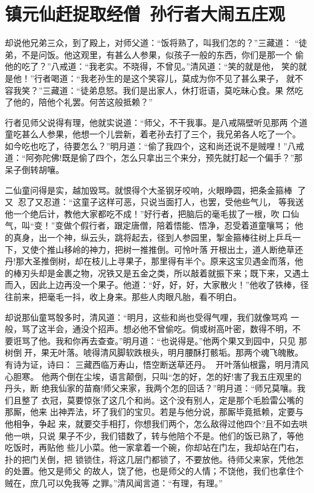 \chapter{镇元仙赶捉取经僧~孙行者大闹五庄观}

却说他兄弟三众，到了殿上，对师父道：“饭将熟了，叫我们怎的？”三藏道：
“徒弟，不是问饭。他这观里，有甚么人参果，似孩子一般的东西，你们是那一个
偷他的吃了？”八戒道：“我老实。不晓得，不曾见。”清风道：“笑的就是他，
笑的就是他！”行者喝道：“我老孙生的是这个笑容儿，莫成为你不见了甚么果子，
就不容我笑？”三藏道：“徒弟息怒。我们是出家人，休打诳语，莫吃昧心食。果
然吃了他的，陪他个礼罢。何苦这般抵赖？”

行者见师父说得有理，他就实说道：“师父，不干我事。是八戒隔壁听见那两
个道童吃甚么人参果，他想一个儿尝新，着老孙去打了三个，我兄弟各人吃了一个。
如今吃也吃了，待要怎么？”明月道：“偷了我四个，这和尚还说不是贼哩！”八戒
道：“阿弥陀佛!既是偷了四个，怎么只拿出三个来分，预先就打起一个偏手？”那
呆子倒转胡嚷。

二仙童问得是实，越加毁骂。就恨得个大圣钢牙咬响，火眼睁圆，把条金箍棒
了又，忍了又忍道：“这童子这样可恶，只说当面打人，也罢，受他些气儿，
等我送他一个绝后计，教他大家都吃不成！”好行者，把脑后的毫毛拔了一根，吹
口仙气，叫“变！”变做个假行者，跟定唐僧，陪着悟能、悟净，忍受着道童嚷骂；
他的真身，出一个神，纵云头，跳将起去，径到人参园里，掣金箍棒往树上乒乓一
下，又使个推山移岭的神力，把树一推推倒。可怜叶落开根出土，道人断绝草还
丹!那大圣推倒树，却在枝儿上寻果子，那里得有半个。原来这宝贝遇金而落，他
的棒刃头却是金裹之物，况铁又是五金之类，所以敲着就振下来；既下来，又遇土
而入，因此上边再没一个果子。他道：“好，好，好，大家散火！”他收了铁棒，径
往前来，把毫毛一抖，收上身来。那些人肉眼凡胎，看不明白。

却说那仙童骂彀多时，清风道：“明月，这些和尚也受得气哩，我们就像骂鸡
一般，骂了这半会，通没个招声。想必他不曾偷吃。倘或树高叶密，数得不明，不
要诳骂了他。我和你再去查查。”明月道：“也说得是。”他两个果又到园中，只见
那树倒开，果无叶落。唬得清风脚软跌根头，明月腰酥打骸垢。那两个魂飞魄散。
有诗为证，诗曰：
三藏西临万寿山，悟空断送草还丹。
开叶落仙根露，明月清风心胆寒。
他两个倒在尘埃，语言颠倒，只叫“怎的好，怎的好!害了我五庄观里的丹头，断
绝我仙家的苗裔!师父来家，我两个怎的回话？”明月道：“师兄莫嚷。我们且整了
衣冠，莫要惊张了这几个和尚。这个没有别人，定是那个毛脸雷公嘴的那厮，他来
出神弄法，坏了我们的宝贝。若是与他分说，那厮毕竟抵赖，定要与他相争，争起
来，就要交手相打，你想我们两个，怎么敌得过他四个?且不如去哄他一哄，只说
果子不少，我们错数了，转与他陪个不是。他们的饭已熟了，等他吃饭时，再贴他
些儿小菜。他一家拿着一个碗，你却站在门左，我却站在门右，扑的把门关倒，把
锁锁住，将这几层门都锁了，不要放他。待师父来家，凭他怎的处置。他又是师父
的故人，饶了他，也是师父的人情；不饶他，我们也拿住个贼在，庶几可以免我等
之罪。”清风闻言道：“有理，有理。”

